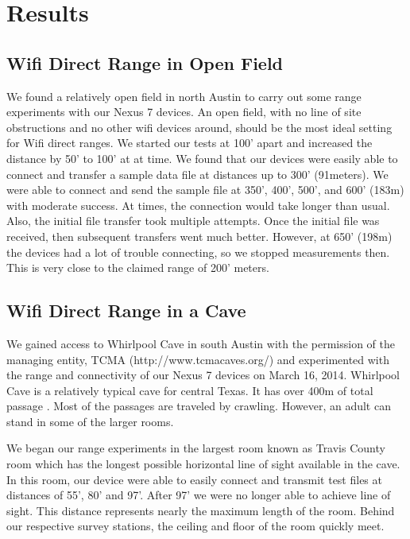 \documentclass[10pt,twocolumn]{article}
\begin{document}
\section{Results}

\subsection{Wifi Direct Range in Open Field}

We found a relatively open field in north Austin to carry out some range experiments with our Nexus 7 devices.
An open field, with no line of site obstructions and no other wifi devices around, should be the most ideal setting for Wifi direct ranges.
We started our tests at 100' apart and increased the distance by 50' to 100' at at time.
We found that our devices were easily able to connect and transfer a sample data file at distances up to 300' (91meters). 
We were able to connect and send the sample file at 350', 400', 500', and 600' (183m) with moderate success. 
At times, the connection would take longer than usual.
Also, the initial file transfer took multiple attempts.
Once the initial file was received, then subsequent transfers went much better.
However, at 650' (198m) the devices had a lot of trouble connecting, so we stopped measurements then.
This is very close to the claimed range of 200' meters.

\subsection{Wifi Direct Range in a Cave}
We gained access to Whirlpool Cave in south Austin with the permission of the managing entity, TCMA (http://www.tcmacaves.org/) and experimented with the range and connectivity of our Nexus 7 devices on March 16, 2014.
Whirlpool Cave is a relatively typical cave for central Texas.
It has over 400m of total passage \cite{whirlpool}. 
Most of the passages are traveled by crawling.
However, an adult can stand in some of the larger rooms.

We began our range experiments in the largest room known as Travis County room which has the longest possible horizontal line of sight available in the cave.
In this room, our device were able to easily connect and transmit test files at distances of 55', 80' and 97'. 
After 97' we were no longer able to achieve line of sight.
This distance represents nearly the maximum length of the room. 
Behind our respective survey stations, the ceiling and floor of the room quickly meet.
\end{document}
